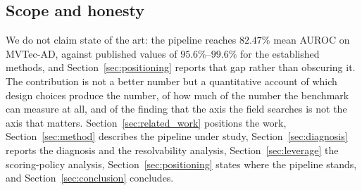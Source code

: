 \subsection*{Scope and honesty}

We do not claim state of the art: the pipeline reaches $82.47\%$ mean AUROC on
MVTec-AD, against published values of $95.6\%$--$99.6\%$ for the established
methods, and Section~\ref{sec:positioning} reports that gap rather than obscuring
it. The contribution is not a better number but a quantitative account of which
design choices produce the number, of how much of the number the benchmark can
measure at all, and of the finding that the axis the field searches is not the
axis that matters. Section~\ref{sec:related_work} positions the work,
Section~\ref{sec:method} describes the pipeline under study,
Section~\ref{sec:diagnosis} reports the diagnosis and the resolvability analysis,
Section~\ref{sec:leverage} the scoring-policy analysis,
Section~\ref{sec:positioning} states where the pipeline stands, and
Section~\ref{sec:conclusion} concludes.
